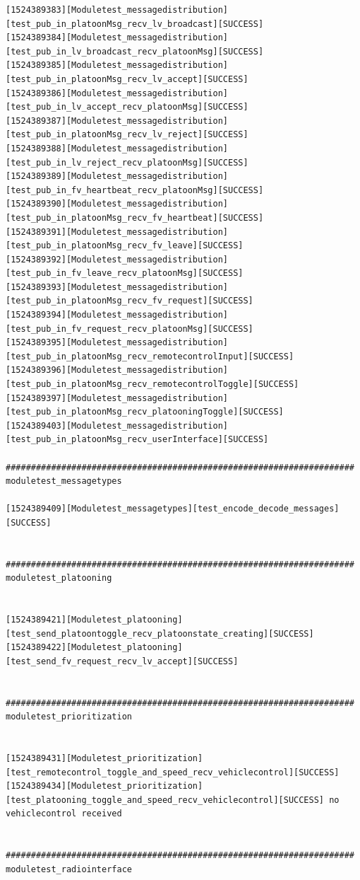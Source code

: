 \documentclass[a4paper, 12pt, titlepage]{scrartcl}
\begin{document}
{\begin{lstlisting}[basicstyle=\tiny]
[1524389383][Moduletest_messagedistribution][test_pub_in_platoonMsg_recv_lv_broadcast][SUCCESS]
[1524389384][Moduletest_messagedistribution][test_pub_in_lv_broadcast_recv_platoonMsg][SUCCESS]
[1524389385][Moduletest_messagedistribution][test_pub_in_platoonMsg_recv_lv_accept][SUCCESS]
[1524389386][Moduletest_messagedistribution][test_pub_in_lv_accept_recv_platoonMsg][SUCCESS]
[1524389387][Moduletest_messagedistribution][test_pub_in_platoonMsg_recv_lv_reject][SUCCESS]
[1524389388][Moduletest_messagedistribution][test_pub_in_lv_reject_recv_platoonMsg][SUCCESS]
[1524389389][Moduletest_messagedistribution][test_pub_in_fv_heartbeat_recv_platoonMsg][SUCCESS]
[1524389390][Moduletest_messagedistribution][test_pub_in_platoonMsg_recv_fv_heartbeat][SUCCESS]
[1524389391][Moduletest_messagedistribution][test_pub_in_platoonMsg_recv_fv_leave][SUCCESS]
[1524389392][Moduletest_messagedistribution][test_pub_in_fv_leave_recv_platoonMsg][SUCCESS]
[1524389393][Moduletest_messagedistribution][test_pub_in_platoonMsg_recv_fv_request][SUCCESS]
[1524389394][Moduletest_messagedistribution][test_pub_in_fv_request_recv_platoonMsg][SUCCESS]
[1524389395][Moduletest_messagedistribution][test_pub_in_platoonMsg_recv_remotecontrolInput][SUCCESS]
[1524389396][Moduletest_messagedistribution][test_pub_in_platoonMsg_recv_remotecontrolToggle][SUCCESS]
[1524389397][Moduletest_messagedistribution][test_pub_in_platoonMsg_recv_platooningToggle][SUCCESS]
[1524389403][Moduletest_messagedistribution][test_pub_in_platoonMsg_recv_userInterface][SUCCESS]

#####################################################################
moduletest_messagetypes

[1524389409][Moduletest_messagetypes][test_encode_decode_messages][SUCCESS]


#####################################################################
moduletest_platooning


[1524389421][Moduletest_platooning][test_send_platoontoggle_recv_platoonstate_creating][SUCCESS]
[1524389422][Moduletest_platooning][test_send_fv_request_recv_lv_accept][SUCCESS]


#####################################################################
moduletest_prioritization


[1524389431][Moduletest_prioritization][test_remotecontrol_toggle_and_speed_recv_vehiclecontrol][SUCCESS]
[1524389434][Moduletest_prioritization][test_platooning_toggle_and_speed_recv_vehiclecontrol][SUCCESS] no vehiclecontrol received


#####################################################################
moduletest_radiointerface



\end{lstlisting}}
\end{document}
